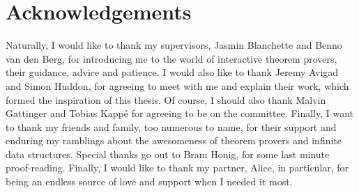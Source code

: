 \section*{Acknowledgements}
Naturally, I would like to thank my supervisors, Jasmin Blanchette and Benno van den Berg, for 
introducing me to the world of interactive theorem provers, their guidance, advice and patience.
I would also like to thank Jeremy Avigad and Simon Huddon, for agreeing to meet with me and explain their work, which formed the inspiration of this thesis. Of course, I should also thank Malvin Gattinger and
Tobias Kappé for agreeing to be on the committee. Finally, I want to thank my friends and family, too
numerous to name, for their support and enduring my ramblings about the awesomeness of theorem provers and infinite data structures. Special thanks go out to Bram Honig, for some last minute proof-reading. Finally, I would like to thank my partner, Alice, in particular, for
being an endless source of love and support when I needed it most.


\tableofcontents


\newpage
{}